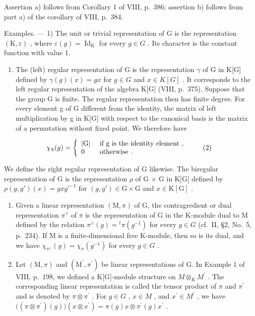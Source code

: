 Assertion a) follows from Corollary 1 of VIII, p.~386; assertion b) follows from part a) of the corollary of VIII, p.~384.

Examples. --- 1) The unit or trivial representation of G is the representation \((\mathrm{K}, \varepsilon)\) , where \(\varepsilon(g) = \operatorname{Id}_{\mathrm{K}}\) for every \(g \in G\) . Its character is the constant function with value 1.

\begin{enumerate}
\def\labelenumi{\arabic{enumi})}
\setcounter{enumi}{1}
\tightlist
\item
  The (left) regular representation of G is the representation \(\gamma\) of G in K{[}G{]} defined by \(\gamma(g)(x)=gx\) for \(g\in G\) and \(x\in K[G]\) . It corresponds to the left regular representation of the algebra K{[}G{]} (VIII, p.~375). Suppose that the group G is finite. The regular representation then has finite degree. For every element g of G different from the identity, the matrix of left multiplication by g in K{[}G{]} with respect to the canonical basis is the matrix of a permutation without fixed point. We therefore have
\end{enumerate}

\[
\chi_ {\boldsymbol {\gamma}} (g) = \left\{ \begin{array}{l l} | \mathrm{G} | & \text { if   g   is   the   identity   element }, \\ 0 & \text { otherwise }. \end{array} \right.\tag{2}
\]

We define the right regular representation of G likewise. The biregular representation of G is the representation \(\rho\) of G × G in K{[}G{]} defined by \(\rho(g, g')(x) = gxg'^{-1}\) for \((g, g') \in \mathrm{G} \times \mathrm{G}\) and \(x \in \mathrm{K}[\mathrm{G}]\) .

\begin{enumerate}
\def\labelenumi{\arabic{enumi})}
\setcounter{enumi}{2}
\item
  Given a linear representation \((\mathrm{M},\pi)\) of G, the contragredient or dual representation \(\pi^{\vee}\) of \(\pi\) is the representation of G in the K-module dual to M defined by the relation \(\pi^{\vee}(g)={}^{t}\pi(g^{-1})\) for every \(g\in G\) (cf.~II, §2, No.~5, p.~234). If M is a finite-dimensional free K-module, then so is its dual, and we have \(\chi_{\pi^{\vee}}(g)=\chi_{\pi}(g^{-1})\) for every \(g\in G\) .
\item
  Let \((\mathrm{M},\pi)\) and \((\mathrm{M}^{\prime},\pi^{\prime})\) be linear representations of G. In Example 1 of VIII, p.~198, we defined a K{[}G{]}-module structure on \(M\otimes_{K}M^{\prime}\) . The corresponding linear representation is called the tensor product of \(\pi\) and \(\pi^{\prime}\) and is denoted by \(\pi\otimes\pi^{\prime}\) . For \(g\in G\) , \(x\in M\) , and \(x^{\prime}\in M^{\prime}\) , we have \(\big((\pi\otimes\pi^{\prime})(g)\big)(x\otimes x^{\prime})=\pi(g)x\otimes\pi^{\prime}(g)x^{\prime}\) .
\end{enumerate}

